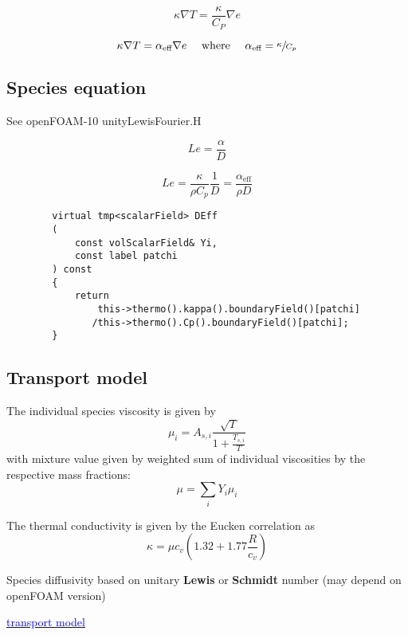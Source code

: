 \documentclass[a4paper, 12pt]{article}
\numberwithin{equation}{section}
\newcommand{\code}{\fontfamily{pcr}\selectfont}
\newcommand{\blue}[1]{\textcolor{blue}{#1}}
\begin{document}
        \begin{equation}
        \kappa \nabla T = \frac{\kappa}{C_P} \nabla e
        \end{equation}

        \begin{equation}
        \kappa \nabla T = \alpha_\text{eff} \nabla e \quad \text{ where } \quad  \alpha_\text{eff} = \sfrac{\kappa}{C_p}
        \end{equation}

    \subsection{Species equation}

        See openFOAM-10 {\code unityLewisFourier.H}

        \begin{equation}
        Le = \frac{\alpha}{D}
        \end{equation}

        \begin{equation}
        Le = \frac{\kappa}{\rho C_p} \frac{1}{D} = \frac{\alpha_\text{eff}}{\rho D}
        \end{equation}

    {
    \begin{verbatim}
        virtual tmp<scalarField> DEff
        (
            const volScalarField& Yi,
            const label patchi
        ) const
        {
            return
                this->thermo().kappa().boundaryField()[patchi]
               /this->thermo().Cp().boundaryField()[patchi];
        }
    \end{verbatim}
    }

    \subsection{Transport model}

        The individual species viscosity is given by
        \begin{equation}
            \mu_i = A_{s,i} \frac{\sqrt{T}}{1 + \frac{T_{s,i}}{T}}
        \end{equation}
        with mixture value given by weighted sum of individual viscosities by the respective mass fractions:
        \begin{equation}
            \mu = \sum_i Y_i \mu_i
        \end{equation}

        The thermal conductivity is given by the Eucken correlation as
        \begin{equation}
            \kappa = \mu c_v \left( 1.32 + 1.77 \frac{R}{c_v} \right)
        \end{equation}

        Species diffusivity based on unitary \textbf{Lewis} or \textbf{Schmidt} number (may depend on openFOAM version)

        \href{
        https://pure.tue.nl/ws/portalfiles/portal/305474394/1013373-Neural\_Network\_Hydrogen\_Combustion\_Modelling.pdf
        }{\blue{transport model}}
\end{document}
